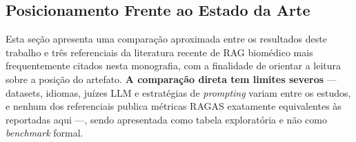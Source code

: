 \documentclass[
  12pt,
  oneside,
  a4paper,
  english,
  brazil
]{abntex2}
\begin{document}
\begin{apendicesenv}
\chapter{Posicionamento Frente ao Estado da Arte}
\label{ape:estado-arte}

Esta seção apresenta uma comparação aproximada entre os resultados deste
trabalho e três referenciais da literatura recente de RAG biomédico
mais frequentemente citados nesta monografia, com a finalidade de orientar
a leitura sobre a posição do artefato. \textbf{A comparação direta tem
limites severos} --- datasets, idiomas, juízes LLM e estratégias de
\textit{prompting} variam entre os estudos, e nenhum dos referenciais
publica métricas RAGAS exatamente equivalentes às reportadas aqui ---,
sendo apresentada como tabela exploratória e não como \textit{benchmark}
formal.


\end{apendicesenv}
\end{document}
